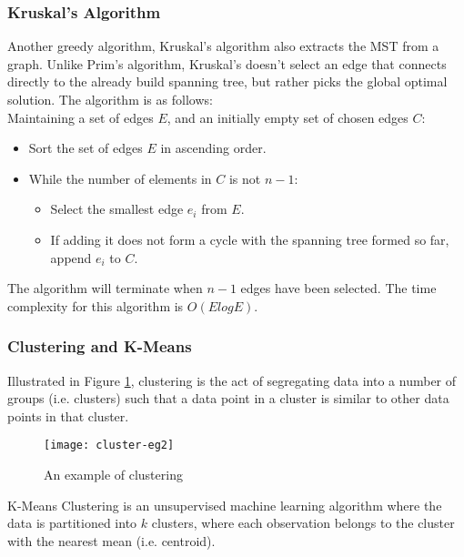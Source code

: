 \documentclass[a4paper,11pt]{article}
\begin{document}
\subsubsection{Kruskal's Algorithm}
Another greedy algorithm,  Kruskal's algorithm \cite{kruskal} also extracts the MST from a graph.  Unlike Prim's algorithm, Kruskal's doesn't select an edge that connects directly to the already build spanning tree, but rather picks the global optimal solution. The algorithm is as follows:\\
Maintaining a set of edges $E$, and an initially empty set of chosen edges $C$:
\begin{itemize}
\item Sort the set of edges $E$ in ascending order.
\item While the number of elements in $C$ is not $n-1$:
	\begin{itemize}
	\item Select the smallest edge $e_i$ from $E$.
	\item If adding it does not form a cycle with the spanning tree formed so far, append $e_i$ to $C$.
	\end{itemize}
\end{itemize}
The algorithm will terminate when $n-1$ edges have been selected.  The time complexity for this algorithm is $O(ElogE)$.
\subsubsection{Clustering and K-Means}
Illustrated in Figure \ref{fig:clustering-eg}, clustering is the act of segregating data into a number of groups (i.e. clusters) such that a data point in a cluster is similar to other data points in that cluster.
\begin{figure}[H]
\centering
\texttt{[image: cluster-eg2]}
\caption{An example of clustering}\label{fig:clustering-eg}
\end{figure}
\noindent K-Means Clustering \cite{kmeans} is an unsupervised machine learning algorithm where the data is partitioned into $k$ clusters, where each observation belongs to the cluster with the nearest mean (i.e. centroid).
\end{document}
